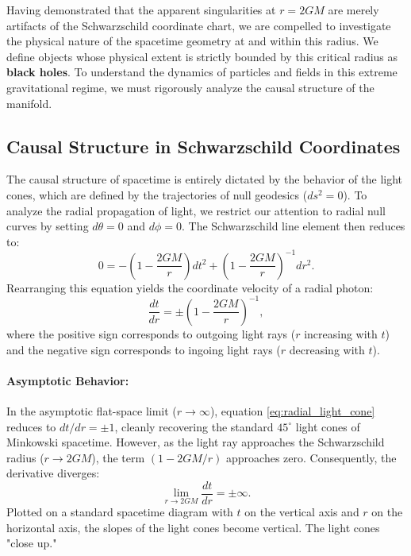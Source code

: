 \documentclass[11pt, a4paper]{report}
\begin{document}
Having demonstrated that the apparent singularities at $r = 2GM$ are merely artifacts of the Schwarzschild coordinate chart, we are compelled to investigate the physical nature of the spacetime geometry at and within this radius. We define objects whose physical extent is strictly bounded by this critical radius as \textbf{black holes}. To understand the dynamics of particles and fields in this extreme gravitational regime, we must rigorously analyze the causal structure of the manifold.

\subsection{Causal Structure in Schwarzschild Coordinates}

The causal structure of spacetime is entirely dictated by the behavior of the light cones, which are defined by the trajectories of null geodesics ($ds^{2} = 0$). To analyze the radial propagation of light, we restrict our attention to radial null curves by setting $d\theta = 0$ and $d\phi = 0$. The Schwarzschild line element then reduces to:
\begin{equation}
0 = -\left(1-\frac{2GM}{r}\right)dt^{2} + \left(1-\frac{2GM}{r}\right)^{-1}dr^{2}.
\end{equation}
Rearranging this equation yields the coordinate velocity of a radial photon:
\begin{equation}
\label{eq:radial_light_cone}
\frac{dt}{dr} = \pm \left( 1 - \frac{2GM}{r} \right)^{-1},
\end{equation}
where the positive sign corresponds to outgoing light rays ($r$ increasing with $t$) and the negative sign corresponds to ingoing light rays ($r$ decreasing with $t$).

\paragraph{Asymptotic Behavior:} 
In the asymptotic flat-space limit ($r \to \infty$), equation \eqref{eq:radial_light_cone} reduces to $dt/dr = \pm 1$, cleanly recovering the standard $45^{\circ}$ light cones of Minkowski spacetime. However, as the light ray approaches the Schwarzschild radius ($r \to 2GM$), the term $(1 - 2GM/r)$ approaches zero. Consequently, the derivative diverges:
\begin{equation}
\lim_{r \to 2GM} \frac{dt}{dr} = \pm \infty.
\end{equation}
Plotted on a standard spacetime diagram with $t$ on the vertical axis and $r$ on the horizontal axis, the slopes of the light cones become vertical. The light cones "close up." 
\end{document}
